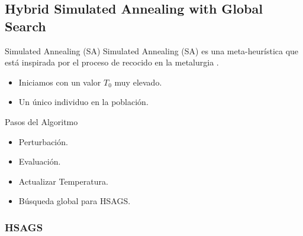 \subsection{Hybrid Simulated Annealing with Global Search}

\begin{frame}{}
\begin{block}{Simulated Annealing (SA)}
Simulated Annealing (SA) \cite{SA1, SA2, SA3} es una meta-heurística que está inspirada por el proceso de recocido en la metalurgia \cite{metabook}.
\begin{itemize}
  \item Iniciamos con un valor $T_{0}$ muy elevado.
  \item Un único individuo en la población.
\end{itemize}
\end{block}
\begin{block}{Pasos del Algoritmo}
\begin{itemize}
  \item Perturbación.
  \item Evaluación.
  \item Actualizar Temperatura.
  \item Búsqueda global para HSAGS.
\end{itemize}
\end{block}
\end{frame}

\begin{frame}
\frametitle{HSAGS}
\centering
\end{frame}
